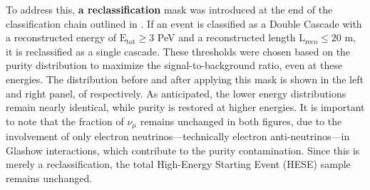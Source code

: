 To address this, \textbf{a reclassification} mask was introduced at the end of the classification chain outlined in . If an event is classified as a Double Cascade with a reconstructed energy of \(\mathrm{E}_{\mathrm{tot}} \geq 3\) PeV and a reconstructed length \(\mathrm{L}_{\mathrm{reco}} \leq 20\) m, it is reclassified as a single cascade. These thresholds were chosen based on the purity distribution to maximize the signal-to-background ratio, even at these energies. The distribution before and after applying this mask is shown in the left and right panel, of  respectively. As anticipated, the lower energy distributions remain nearly identical, while purity is restored at higher energies. It is important to note that the fraction of \(\nu_{\mu}\) remains unchanged in both figures, due to the involvement of only electron neutrinos—technically electron anti-neutrinos—in Glashow interactions, which contribute to the purity contamination. Since this is merely a reclassification, the total High-Energy Starting Event (HESE) sample remains unchanged.
 

